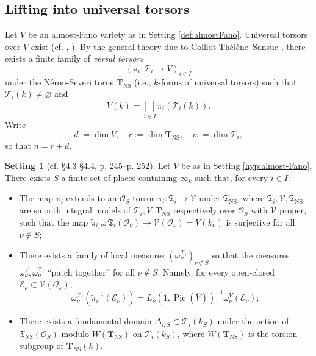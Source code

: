 \documentclass[11pt,letterpaper]{amsart}
\newcommand{\CE}{{\mathcal {E}}}
\newcommand{\CO}{{\mathcal {O}}}
\newcommand{\CV}{{\mathcal {V}}}
\newcommand{\Pic}{\operatorname{Pic}}
\newcommand{\CTUT}{\mathcal{T}}
\newcommand{\FTUT}{\mathfrak{T}}
\newcommand{\CTNS}{\mathbf{T}_{\operatorname{NS}}}
\newcommand{\FTNS}{\mathfrak{T}_{\operatorname{NS}}}
\theoremstyle{plain}
\numberwithin{equation}{section}
\theoremstyle{definition}
\newtheorem{hypothesis}[theorem]{Setting}
\theoremstyle{remark}
\begin{document}
\subsection{Lifting into universal torsors}\label{se:lifting}
Let $V$ be an almost-Fano variety as in Setting \ref{def:almostFano}. Universal torsors over $V$ exist (cf. \cite[\S2.0.4]{CT-Sansuc}, \cite[Construction 4.20]{PeyreBeyond}).
By the general theory due to Colliot-Th\'el\`ene--Sansuc \cite[Théorème 2.7.3]{CT-Sansuc}, there exists a finite family of \emph{versal torsors} \begin{equation}\label{eq:pii}
	(\pi_i:\CTUT_i\to V)_{i\in I}
\end{equation} under the N\'eron-Severi torus $\CTNS$ (i.e., $k$-forms of universal torsors) such that $\CTUT_i(k)\neq\varnothing$ and 
$$V(k)=\bigsqcup_{i\in I} \pi_i(\CTUT_i(k)).$$
Write $$d:=\dim V,\quad r:=\dim\CTNS,\quad n:=\dim\CTUT_i,$$ so that $n=r+d$. 
\begin{hypothesis}[cf. \cite{Peyre2} \S4.3 \S4.4, \cite{PeyreBeyond} p. 245--p. 252]\label{hyp:univtor}
Let $V$ be as in Setting \ref{hyp:almost-Fano}. There exists $S$ a finite set of places containing $\infty_k$ such that, for every $i\in I$:
	\begin{itemize}
		\item The map $\pi_i$ extends to an $\CO_S$-torsor $\widetilde{\pi}_i:\FTUT_i\to\CV$ under $\FTNS$, where $\FTUT_i,\CV,\FTNS$ are smooth integral models of $\CTUT_i,V,\CTNS$ respectively over $\CO_S$ with $\CV$ proper, such that the map $\widetilde{\pi}_{i,\nu}:\FTUT_i(\CO_\nu)\to\CV(\CO_{\nu})=V(k_\nu)$ is surjective for all $\nu\notin S$;
		\item There exists a family of local measures $(\omega_\nu^{\CTUT_i})_{\nu\notin S}$ so that the measures $\omega^V_\nu,\omega_\nu^{\CTUT_i}$ ``patch together'' for all $\nu\notin S$. Namely, for every open-closed $\CE_\nu\subset \CV(\CO_\nu)$, \begin{equation}\label{eq:patch}
		\omega_\nu^{\CTUT_i}(\widetilde{\pi}_{i}^{-1}(\CE_\nu))=L_\nu(1,\Pic(\overline{V}))^{-1}\omega_\nu^V(\CE_\nu);
		\end{equation}
		\item There exists a fundamental domain $\varDelta_{i,S}\subset \CTUT_i(k_S)$
	 under the action of $\FTNS(\CO_S)$ modulo $W(\CTNS)$ on $\CTUT_i(k_S)$, where  $W(\CTNS)$ is the torsion subgroup of $\CTNS(k)$.
	\end{itemize}
\end{hypothesis}
\end{document}
